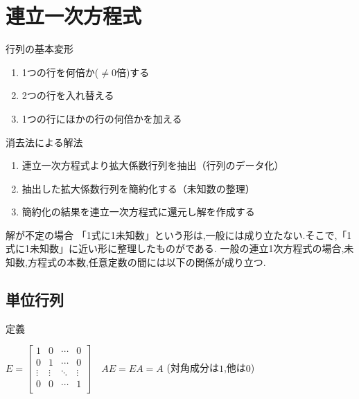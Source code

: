 \documentclass[a4paper]{jsarticle}
\begin{document}
\section{連立一次方程式}
\begin{itembox}[l]{行列の基本変形}
    \begin{enumerate}[(1)]
        \item 1つの行を何倍か($\neq0$倍)する
        \item 2つの行を入れ替える
        \item 1つの行にほかの行の何倍かを加える
    \end{enumerate}
\end{itembox}
\begin{itembox}[l]{消去法による解法}
    \begin{enumerate}[(1)]
        \item 連立一次方程式より拡大係数行列を抽出（行列のデータ化）
        \item 抽出した拡大係数行列を簡約化する（未知数の整理）
        \item 簡約化の結果を連立一次方程式に還元し解を作成する
    \end{enumerate}
\end{itembox}
\begin{itembox}[l]{解が不定の場合}
    「1式に1未知数」という形は,一般には成り立たない.そこで,「1式に1未知数」に近い形に整理したものがである.
    一般の連立1次方程式の場合,未知数,方程式の本数,任意定数の間には以下の関係が成り立つ.
    \begin{center}
    \end{center}
\end{itembox}
\subsection{単位行列}
\begin{itembox}[l]{定義}
    \begin{center}
        $E=
            \begin{bmatrix}
                1      & 0      & \cdots & 0      \\
                0      & 1      & \cdots & 0      \\
                \vdots & \vdots & \ddots & \vdots \\
                0      & 0      & \cdots & 1      \\
            \end{bmatrix}
            \quad AE=EA=A
        $
        \quad(対角成分は$1$,他は$0$)
    \end{center}
\end{itembox}
\end{document}

